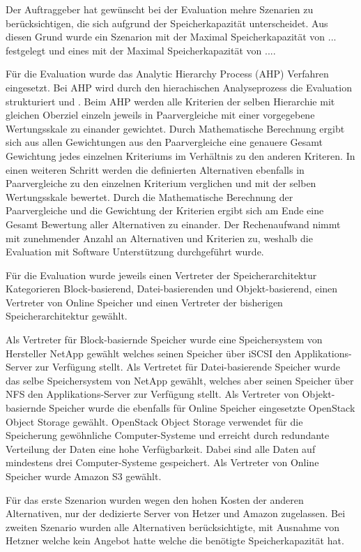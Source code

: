Der Auftraggeber hat gewünscht bei der Evaluation mehre Szenarien zu berücksichtigen, die sich aufgrund der Speicherkapazität unterscheidet. Aus diesen Grund wurde ein Szenarion mit der Maximal Speicherkapazität von ... festgelegt und eines mit der Maximal Speicherkapazität von ....

Für die Evaluation wurde das Analytic Hierarchy Process (AHP) Verfahren eingesetzt. Bei AHP wird durch den hierachischen Analyseprozess die Evaluation strukturiert und . Beim AHP werden alle Kriterien der selben Hierarchie mit gleichen Oberziel einzeln jeweils in Paarvergleiche mit einer vorgegebene Wertungsskale zu einander gewichtet. Durch Mathematische Berechnung ergibt sich aus allen Gewichtungen aus den Paarvergleiche eine genauere Gesamt Gewichtung jedes einzelnen Kriteriums im Verhältnis zu den anderen Kriteren. In einen weiteren Schritt werden die definierten Alternativen ebenfalls in Paarvergleiche zu den einzelnen Kriterium verglichen und mit der selben Wertungsskale bewertet. Durch die Mathematische Berechnung der Paarvergleiche und die Gewichtung der Kriterien ergibt sich am Ende eine Gesamt Bewertung aller Alternativen zu einander. Der Rechenaufwand nimmt mit zunehmender Anzahl an Alternativen und Kriterien zu, weshalb die Evaluation mit Software Unterstützung durchgeführt wurde.

Für die Evaluation wurde jeweils einen Vertreter der Speicherarchitektur Kategorieren Block-basierend, Datei-basierenden und Objekt-basierend, einen Vertreter von Online Speicher und einen Vertreter der bisherigen Speicherarchitektur gewählt. 

Als Vertreter für Block-basiernde Speicher wurde eine Speichersystem von Hersteller NetApp gewählt welches seinen Speicher über iSCSI den Applikations-Server zur Verfügung stellt. Als Vertretet für Datei-basierende Speicher wurde das selbe Speichersystem von NetApp gewählt, welches aber seinen Speicher über NFS den Applikations-Server zur Verfügung stellt. Als Vertreter von Objekt-basiernde Speicher wurde die ebenfalls für Online Speicher eingesetzte OpenStack Object Storage gewählt. OpenStack Object Storage verwendet für die Speicherung gewöhnliche Computer-Systeme und erreicht durch redundante Verteilung der Daten eine hohe Verfügbarkeit. Dabei sind alle Daten auf mindestens drei Computer-Systeme gespeichert. Als Vertreter von Online Speicher wurde Amazon S3 gewählt.


Für das erste Szenarion wurden wegen den hohen Kosten der anderen Alternativen, nur der dedizierte Server von Hetzer und Amazon zugelassen. Bei zweiten Szenario wurden alle Alternativen berücksichtigte, mit Ausnahme von Hetzner welche kein Angebot hatte welche die benötigte Speicherkapazität hat. 

